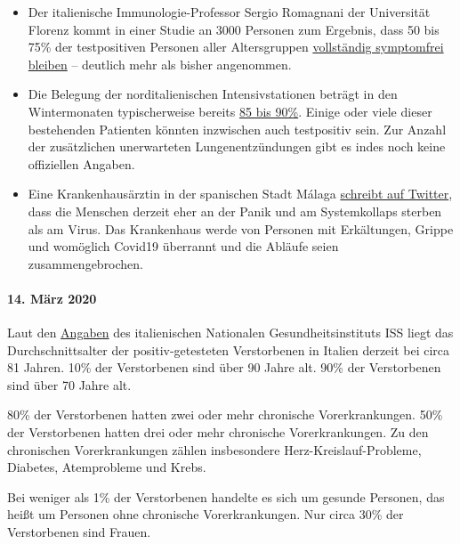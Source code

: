 \begin{itemize}
\tightlist
\item
  Der italienische Immunologie-Professor Sergio Romagnani der
  Universität Florenz kommt in einer Studie an 3000 Personen zum
  Ergebnis, dass 50 bis 75\% der testpositiven Personen aller
  Altersgruppen
  \href{https://www.repubblica.it/salute/medicina-e-ricerca/2020/03/16/news/coronavirus_studio_il_50-75_dei_casi_a_vo_sono_asintomatici_e_molto_contagiosi-251474302/}{vollständig
  symptomfrei bleiben} -- deutlich mehr als bisher angenommen.
\item
  Die Belegung der norditalienischen Intensivstationen beträgt in den
  Wintermonaten typischerweise bereits
  \href{https://jamanetwork.com/journals/jama/fullarticle/2763188}{85
  bis 90\%}. Einige oder viele dieser bestehenden Patienten könnten
  inzwischen auch testpositiv sein. Zur Anzahl der zusätzlichen
  unerwarteten Lungenentzündungen gibt es indes noch keine offiziellen
  Angaben.
\item
  Eine Krankenhausärztin in der spanischen Stadt Málaga
  \href{https://twitter.com/NeurologaenSAS/status/1239498772570308609}{schreibt
  auf Twitter}, dass die Menschen derzeit eher an der Panik und am
  Systemkollaps sterben als am Virus. Das Krankenhaus werde von Personen
  mit Erkältungen, Grippe und womöglich Covid19 überrannt und die
  Abläufe seien zusammengebrochen.
\end{itemize}

\hypertarget{14-muxe4rz-2020}{%
\paragraph{14. März 2020}\label{14-muxe4rz-2020}}

Laut den
\href{https://www.epicentro.iss.it/coronavirus/sars-cov-2-decessi-italia}{Angaben}
des italienischen Nationalen Gesundheitsinstituts ISS liegt das
Durch­schnitts­­alter der positiv-getesteten Verstorbenen in Italien
derzeit bei circa 81 Jahren. 10\% der Verstorbenen sind über 90 Jahre
alt. 90\% der Verstorbenen sind über 70 Jahre alt.

80\% der Verstorbenen hatten zwei oder mehr chronische Vorerkrankungen.
50\% der Verstorbenen hatten drei oder mehr chronische Vorerkrankungen.
Zu den chronischen Vorerkrankungen zählen insbesondere
Herz-Kreislauf-Probleme, Diabetes, Atemprobleme und Krebs.

Bei weniger als 1\% der Verstorbenen handelte es sich um gesunde
Personen, das heißt um Personen ohne chronische Vorerkrankungen. Nur
circa 30\% der Verstorbenen sind Frauen.

